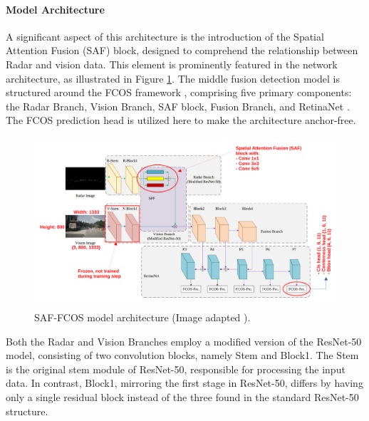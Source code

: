 \documentclass[report.tex]{subfiles}
\begin{document}

    \paragraph*{Model Architecture}

    A significant aspect of this architecture is the introduction of the Spatial Attention Fusion (SAF) block, designed to comprehend the relationship between Radar and vision data. This element is prominently featured in the network architecture, as illustrated in Figure \ref{fig:saffcos_model_architecture}. The middle fusion detection model is structured around the FCOS framework \cite{tian2019fcos}, comprising five primary components: the Radar Branch, Vision Branch, SAF block, Fusion Branch, and RetinaNet \cite{tian2019fcos}. The FCOS prediction head is utilized here to make the architecture anchor-free.

    \begin{figure}[h]
        \centering
        \includegraphics[width=1.0\textwidth]{images/methods/saf_fcos/model_architecture.pdf}
        \caption{SAF-FCOS model architecture (Image adapted \cite{chang2020spatial}).}
        \label{fig:saffcos_model_architecture}
    \end{figure}                

    Both the Radar and Vision Branches employ a modified version of the ResNet-50 \cite{he2016deep} model, consisting of two convolution blocks, namely Stem and Block1. The Stem is the original stem module of ResNet-50, responsible for processing the input data. In contrast, Block1, mirroring the first stage in ResNet-50, differs by having only a single residual block instead of the three found in the standard ResNet-50 structure.
\end{document}
